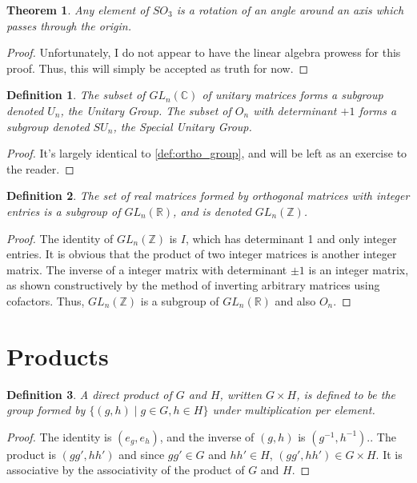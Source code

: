 \documentclass{article}
\newtheorem{theorem}{Theorem}[section]
\newtheorem{definition}{Definition}[section]
\begin{document}
\begin{theorem}
    Any element of $SO_3$ is a rotation of an angle around an axis which passes through the origin.
\end{theorem}
\begin{proof}
    Unfortunately, I do not appear to have the linear algebra prowess for this proof.
    Thus, this will simply be accepted as truth for now.
\end{proof}

\begin{definition}
    The subset of $GL_n(\mathbb{C})$ of unitary matrices forms a subgroup denoted $U_n$, the \emph{Unitary Group}.
    The subset of $O_n$ with determinant $+1$ forms a subgroup denoted $SU_n$, the \emph{Special Unitary Group}.
\end{definition}
\begin{proof}
    It's largely identical to \autoref{def:ortho_group}, and will be left as an exercise to the reader.
\end{proof}

\begin{definition}
    The set of real matrices formed by orthogonal matrices with integer entries
    is a subgroup of $GL_n(\mathbb{R})$, and is denoted $GL_n(\mathbb{Z})$.
\end{definition}
\begin{proof}
    The identity of $GL_n(\mathbb{Z})$ is $I$, which has determinant 1 and only integer entries.
    It is obvious that the product of two integer matrices is another integer matrix.
    The inverse of a integer matrix with determinant $\pm 1$ is an integer matrix,
    as shown constructively by the method of inverting arbitrary matrices using cofactors.
    Thus, $GL_n(\mathbb{Z})$ is a subgroup of $GL_n(\mathbb{R})$ and also $O_n$.
\end{proof}

\section{Products}

\begin{definition}
    A \emph{direct product} of $G$ and $H$, written $G \times H$, is defined to be 
    the group formed by $\{(g,h) \mid g \in G, h \in H\}$ under multiplication per element.
\end{definition}
\begin{proof}
    The identity is $(e_g,e_h)$, and the inverse of $(g,h)$ is $(g^{-1},h^{-1})$..
    The product is $(gg',hh')$ and since $gg' \in G$ and $hh' \in H$, $(gg',hh') \in G \times H$.
    It is associative by the associativity of the product of $G$ and $H$.
\end{proof}
\end{document}
